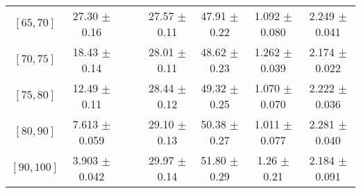 \begin{tabular}{c||c|c|c|c|c|c|c}
$[65, 70]$ & 27.30 $\pm$ 0.16 &  &  & 27.57 $\pm$ 0.11 & 47.91 $\pm$ 0.22 & 1.092 $\pm$ 0.080 & 2.249 $\pm$ 0.041\\
$[70, 75]$ & 18.43 $\pm$ 0.14 &  &  & 28.01 $\pm$ 0.11 & 48.62 $\pm$ 0.23 & 1.262 $\pm$ 0.039 & 2.174 $\pm$ 0.022\\
$[75, 80]$ & 12.49 $\pm$ 0.11 &  &  & 28.44 $\pm$ 0.12 & 49.32 $\pm$ 0.25 & 1.070 $\pm$ 0.070 & 2.222 $\pm$ 0.036\\
$[80, 90]$ & 7.613 $\pm$ 0.059 &  &  & 29.10 $\pm$ 0.13 & 50.38 $\pm$ 0.27 & 1.011 $\pm$ 0.077 & 2.281 $\pm$ 0.040\\
$[90, 100]$ & 3.903 $\pm$ 0.042 &  &  & 29.97 $\pm$ 0.14 & 51.80 $\pm$ 0.29 & 1.26 $\pm$ 0.21 & 2.184 $\pm$ 0.091\\
\end{tabular}
